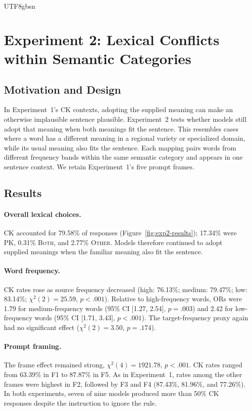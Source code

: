 \documentclass[11pt]{article}
\begin{document}
\begin{CJK*}{UTF8}{gbsn}
\section{Experiment 2: Lexical Conflicts within Semantic Categories}
\label{sec:exp2}

\subsection{Motivation and Design}
\label{sec:exp2-design}

In Experiment~1's CK contexts, adopting the supplied meaning can make an otherwise implausible sentence plausible. Experiment~2 tests whether models still adopt that meaning when both meanings fit the sentence. This resembles cases where a word has a different meaning in a regional variety or specialized domain, while its usual meaning also fits the sentence. Each mapping pairs words from different frequency bands within the same semantic category and appears in one sentence context. We retain Experiment~1's five prompt frames.

\subsection{Results}
\label{sec:exp2-results}

\paragraph{Overall lexical choices.}
CK accounted for 79.58\% of responses (Figure~\ref{fig:exp2-results}); 17.34\% were \textsc{PK}, 0.31\% \textsc{Both}, and 2.77\% \textsc{Other}. Models therefore continued to adopt supplied meanings when the familiar meaning also fit the sentence.

\paragraph{Word frequency.}
CK rates rose as source frequency decreased (high: 76.13\%; medium: 79.47\%; low: 83.14\%; $\chi^2(2)=25.59$, $p<.001$). Relative to high-frequency words, ORs were 1.79 for medium-frequency words (95\% CI [1.27, 2.54], $p=.003$) and 2.42 for low-frequency words (95\% CI [1.71, 3.43], $p<.001$). The target-frequency proxy again had no significant effect ($\chi^2(2)=3.50$, $p=.174$).

\paragraph{Prompt framing.}
The frame effect remained strong, $\chi^2(4)=1921.78$, $p<.001$. CK rates ranged from 63.39\% in F1 to 87.87\% in F5. As in Experiment~1, rates among the other frames were highest in F2, followed by F3 and F4 (87.43\%, 81.96\%, and 77.26\%). In both experiments, seven of nine models produced more than 50\% CK responses despite the instruction to ignore the rule.


\end{CJK*}
\end{document}
